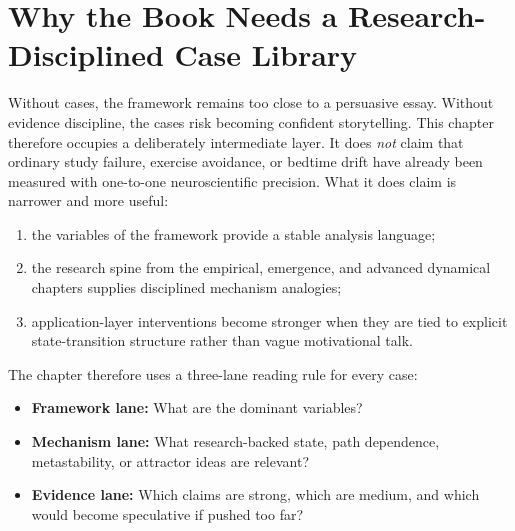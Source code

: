 \section{Why the Book Needs a Research-Disciplined Case Library}

Without cases, the framework remains too close to a persuasive essay. Without
evidence discipline, the cases risk becoming confident storytelling. This
chapter therefore occupies a deliberately intermediate layer. It does
\emph{not} claim that ordinary study failure, exercise avoidance, or bedtime
drift have already been measured with one-to-one neuroscientific precision.
What it does claim is narrower and more useful:
\begin{enumerate}[nosep]
  \item the variables of the framework provide a stable analysis language;
  \item the research spine from the empirical, emergence, and advanced
        dynamical chapters supplies disciplined mechanism analogies;
  \item application-layer interventions become stronger when they are tied to
        explicit state-transition structure rather than vague motivational talk.
\end{enumerate}

The chapter therefore uses a three-lane reading rule for every case:
\begin{itemize}[nosep]
  \item \textbf{Framework lane:} What are the dominant variables?
  \item \textbf{Mechanism lane:} What research-backed state, path dependence,
        metastability, or attractor ideas are relevant?
  \item \textbf{Evidence lane:} Which claims are strong, which are medium, and
        which would become speculative if pushed too far?
\end{itemize}
